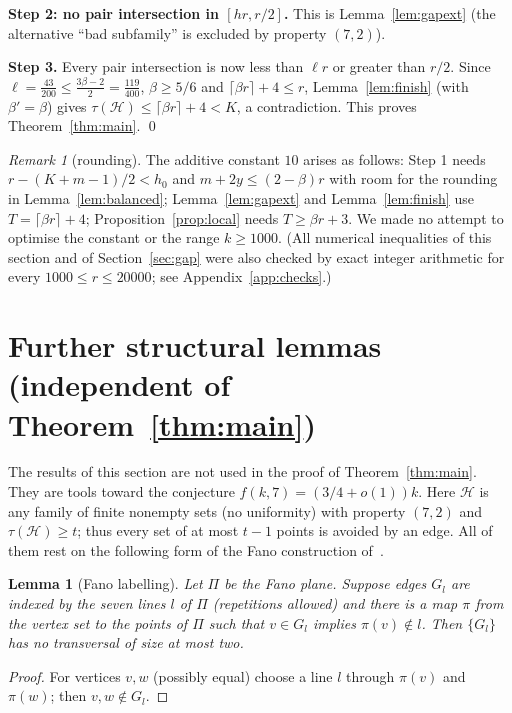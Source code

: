 \documentclass[11pt]{amsart}
\newtheorem{lemma}[theorem]{Lemma}
\theoremstyle{definition}
\theoremstyle{remark}
\newtheorem{remark}[theorem]{Remark}
\newcommand{\cH}{\mathcal H}
\newcommand{\ceil}[1]{\lceil #1\rceil}
\begin{document}
\medskip\noindent\textbf{Step 2: no pair intersection in $[hr,r/2]$.} This is Lemma~\ref{lem:gapext} (the alternative ``bad subfamily'' is excluded by property $(7,2)$).

\medskip\noindent\textbf{Step 3.} Every pair intersection is now less than $\ell r$ or greater than $r/2$. Since $\ell=\tfrac{43}{200}\le\tfrac{3\beta-2}{2}=\tfrac{119}{400}$, $\beta\ge5/6$ and $\ceil{\beta r}+4\le r$, Lemma~\ref{lem:finish} (with $\beta'=\beta$) gives $\tau(\cH)\le\ceil{\beta r}+4<K$, a contradiction. This proves Theorem~\ref{thm:main}. \qed

\begin{remark}[rounding]
The additive constant $10$ arises as follows: Step 1 needs $r-(K+m-1)/2<h_0$ and $m+2y\le(2-\beta)r$ with room for the rounding in Lemma~\ref{lem:balanced}; Lemma~\ref{lem:gapext} and Lemma~\ref{lem:finish} use $T=\ceil{\beta r}+4$; Proposition~\ref{prop:local} needs $T\ge\beta r+3$. We made no attempt to optimise the constant or the range $k\ge1000$. (All numerical inequalities of this section and of Section~\ref{sec:gap} were also checked by exact integer arithmetic for every $1000\le r\le 20000$; see Appendix~\ref{app:checks}.)
\end{remark}

\section{Further structural lemmas (independent of Theorem~\ref{thm:main})}\label{sec:further}

The results of this section are not used in the proof of Theorem~\ref{thm:main}. They are tools toward the conjecture $f(k,7)=(3/4+o(1))k$. Here $\cH$ is any family of finite nonempty sets (no uniformity) with property $(7,2)$ and $\tau(\cH)\ge t$; thus every set of at most $t-1$ points is avoided by an edge. All of them rest on the following form of the Fano construction of~\cite{FKW}.

\begin{lemma}[Fano labelling]\label{lem:fano}
Let $\Pi$ be the Fano plane. Suppose edges $G_l$ are indexed by the seven lines $l$ of $\Pi$ (repetitions allowed) and there is a map $\pi$ from the vertex set to the points of $\Pi$ such that $v\in G_l$ implies $\pi(v)\notin l$. Then $\{G_l\}$ has no transversal of size at most two.
\end{lemma}
\begin{proof}
For vertices $v,w$ (possibly equal) choose a line $l$ through $\pi(v)$ and $\pi(w)$; then $v,w\notin G_l$.
\end{proof}
\end{document}
